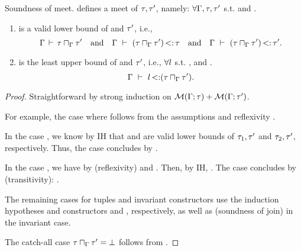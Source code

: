 \begin{theorem}{Soundness of meet.}%
\label{thm:meet-sound}
     defines a meet of $\tau, \tau'$, namely:
    $\forall \Gamma, \tau, \tau'$ s.t. \tyvld{}{\AEnv}
    and .
    \begin{enumerate}
        \item {} is a valid lower bound
            of \ty and $\tau'$, i.e., 
            \[
                \Gamma\,\vdash\,\tau \sqcap_{\Gamma} \tau'
                \quad\text{and}\quad
                \Gamma\ \vdash\ (\tau \sqcap_{\Gamma} \tau') \operatorname{<:} \tau
                \quad\text{and}\quad
                \Gamma\ \vdash\ (\tau \sqcap_{\Gamma} \tau') \operatorname{<:} \tau'.
            \]
        \item {} is the least upper bound
            of \ty and $\tau'$, i.e.,
            $\forall l$ s.t. \tyvlddflt{\tylb},
            \subtydflt{\tylb}{\ty} and .
            \[
                \Gamma\ \vdash\ l \operatorname{<:} (\tau \sqcap_{\Gamma} \tau').
            \]
    \end{enumerate}
\end{theorem}
\begin{proof}
    Straightforward by strong induction on
    $\operatorname{\mathcal{M}}(\Gamma;\tau) + \operatorname{\mathcal{M}}(\Gamma;\tau')$.

    For example, the case where  follows from
    the assumptions and reflexivity \subtydflt{\ty}{\ty}.

    In the case ,
    we know by IH that  and 
    are valid lower bounds of $\tau_1,\tau'$ and $\tau_2,\tau'$, respectively.
    Thus, the case concludes by .

    In the case , we have \subtydflt{\tylb}{\vany}
    by  (reflexivity) and .
    Then, by IH, .
    The case concludes by  (transitivity):
    .
    
    The remaining cases for tuples and invariant constructors
    use the induction hypotheses and constructors  and ,
    respectively, as well as  (soundness of join)
    in the invariant case.

    The catch-all case $\tau \sqcap_{\Gamma} \tau' = \bot$
    follows from .
\end{proof}

